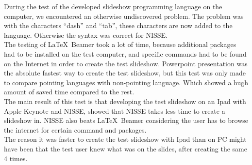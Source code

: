 During the test of the developed slideshow programming language on the computer, we encountered an otherwise undiscovered problem. The problem was with the characters ``dash'' and ``tab'', these characters are now added to the language. Otherwise the syntax was correct for NISSE.\\
The testing of \LaTeX~Beamer took a lot of time, because additional packages had to be installed on the test computer, and specific commands had to be found on the Internet in order to create the test slideshow.
Powerpoint presentation was the absolute fastest way to create the test slideshow, but this test was only made to compare pointing languages with non-pointing language. Which showed a hugh amount of saved time compared to the rest.\\
The main result of this test is that developing the test slideshow on an Ipad with Apple Keynote and NISSE, showed that NISSE takes less time to create a slideshow in. NISSE also beats \LaTeX~Beamer considering the user has to browse the internet for certain command and packages.\\
The reason it was faster to create the test slideshow with Ipad than on PC might have been that the test user knew what was on the slides, after creating the same 4 times.
